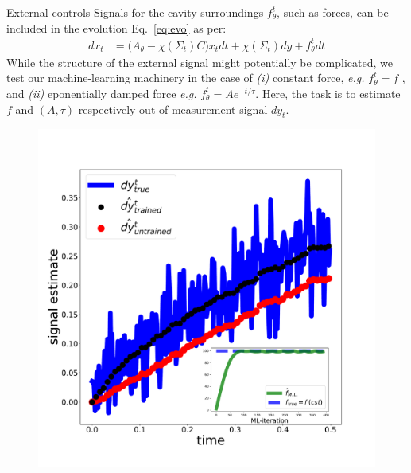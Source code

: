 \documentclass[xcolor={table}]{beamer}
\begin{document}
\begin{frame}[fragile=singleslide,t]
\begin{columns}[onlytextwidth,T]
\begin{column}{.47\textwidth}
\begin{block}{External controls}
  Signals for the cavity surroundings $f^t_\theta$, such as forces, can be included in the evolution Eq.~\eqref{eq:evo} as per:
  \begin{align}
  dx_t &= \big(A_\theta - \chi(\Sigma_t) C\big) x_t dt + \chi(\Sigma_t) dy + f^t_\theta dt
  \end{align}
  While the structure of the external signal might potentially be complicated, we test our machine-learning machinery in the case of \textit{(i)} constant force, \textit{e.g.} $f^t_\theta = f$ , and \textit{(ii)} eponentially damped force \textit{e.g.} $f^t_\theta = A e^{-t/\tau}$. Here, the task is to estimate $f$ and $(A, \tau)$ respectively out of measurement signal $dy_t$.
{\center
\begin{figure}
\centering
  \includegraphics[width=.9\textwidth]{figures_poster/external_learn_signals.pdf}
  \centering

\end{figure}}
\end{block}
\end{column}
\end{columns}
\end{frame}
\end{document}
